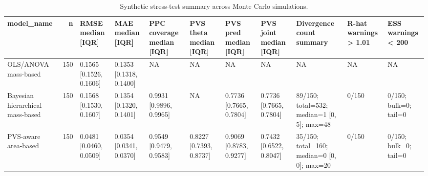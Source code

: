 \begin{table}
\caption{Synthetic stress-test summary across Monte Carlo simulations.}
\label{tab:table_stress_test_summary}
\begin{tabular}{lrlllllllll}
\toprule
model\_name & n & RMSE median [IQR] & MAE median [IQR] & PPC coverage median [IQR] & PVS theta median [IQR] & PVS pred median [IQR] & PVS joint median [IQR] & Divergence count summary & R-hat warnings > 1.01 & ESS warnings < 200 \\
\midrule
OLS/ANOVA mass-based & 150 & 0.1565 [0.1526, 0.1606] & 0.1353 [0.1318, 0.1400] & NA & NA & NA & NA & NA & NA & NA \\
Bayesian hierarchical mass-based & 150 & 0.1568 [0.1530, 0.1607] & 0.1354 [0.1320, 0.1401] & 0.9931 [0.9896, 0.9965] & NA & 0.7736 [0.7665, 0.7804] & 0.7736 [0.7665, 0.7804] & 89/150; total=532; median=1 [0, 5]; max=48 & 0/150 & 0/150; bulk=0; tail=0 \\
PVS-aware area-based & 150 & 0.0481 [0.0460, 0.0509] & 0.0354 [0.0341, 0.0370] & 0.9549 [0.9479, 0.9583] & 0.8227 [0.7393, 0.8737] & 0.9069 [0.8783, 0.9277] & 0.7432 [0.6522, 0.8047] & 35/150; total=160; median=0 [0, 0]; max=20 & 0/150 & 0/150; bulk=0; tail=0 \\
\bottomrule
\end{tabular}
\end{table}
